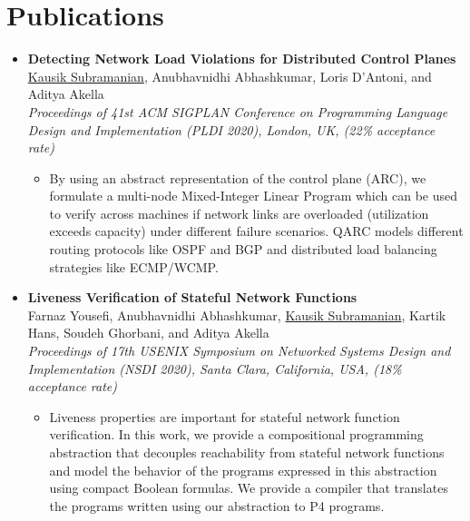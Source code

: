 \documentclass[11pt,a4paper,sans]{moderncv}        %
\begin{document}
\section{Publications}
\begin{itemize}
	\item \textbf{Detecting Network Load Violations for Distributed Control Planes} \\
	\underline{Kausik Subramanian}, Anubhavnidhi Abhashkumar, Loris D’Antoni, and Aditya Akella \\
	\emph{Proceedings of 41st ACM SIGPLAN Conference on Programming Language Design and Implementation (PLDI 2020), London, UK, (22\% acceptance rate)}
	\begin{itemize}
		\item By using an abstract representation of the control plane (ARC), we
		formulate a multi-node Mixed-Integer Linear Program which can be used to
		verify across machines if network links are overloaded (utilization
		exceeds capacity) under different failure scenarios. QARC models
		different routing protocols like OSPF and BGP and distributed load
		balancing strategies like ECMP/WCMP.
	\end{itemize}
	\vspace*{4mm}

	\item \textbf{Liveness Verification of Stateful Network Functions} \\
	Farnaz Yousefi, Anubhavnidhi Abhashkumar, \underline{Kausik Subramanian}, Kartik Hans, Soudeh Ghorbani, and Aditya Akella \\
	\emph{Proceedings of 17th USENIX Symposium on Networked Systems Design and Implementation (NSDI 2020), Santa Clara, California, USA, (18\% acceptance rate)}
	\begin{itemize}
		\item Liveness properties are important for stateful network function verification.
		In this work, we provide a compositional programming abstraction that decouples
		reachability from stateful network functions and model the behavior of the
		programs expressed in
		this abstraction using compact Boolean formulas.
		We provide a compiler that translates the
		programs written using our abstraction to P4 programs.
	\end{itemize}
	\vspace*{4mm}


\end{itemize}
\end{document}
